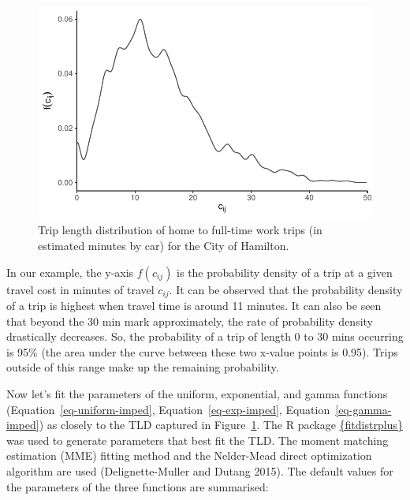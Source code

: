 \documentclass[12pt, oneside]{report}
\begin{document}
\begin{figure}

{\centering \includegraphics{tools-report_files/figure-pdf/fig-TLD-empirical-1.pdf}

}

\caption{\label{fig-TLD-empirical}Trip length distribution of home to
full-time work trips (in estimated minutes by car) for the City of
Hamilton.}

\end{figure}

In our example, the y-axis \(f(c_{ij})\) is the probability density of a
trip at a given travel cost in minutes of travel \(c_{ij}\). It can be
observed that the probability density of a trip is highest when travel
time is around 11 minutes. It can also be seen that beyond the 30 min
mark approximately, the rate of probability density drastically
decreases. So, the probability of a trip of length 0 to 30 mins
occurring is 95\% (the area under the curve between these two x-value
points is 0.95). Trips outside of this range make up the remaining
probability.

Now let's fit the parameters of the uniform, exponential, and gamma
functions (Equation~\ref{eq-uniform-imped}, Equation~\ref{eq-exp-imped},
Equation~\ref{eq-gamma-imped}) as closely to the TLD captured in
Figure~\ref{fig-TLD-empirical}. The R package
\href{https://cloud.r-project.org/web/packages/fitdistrplus/index.html}{\{fitdistrplus\}}
was used to generate parameters that best fit the TLD. The moment
matching estimation (MME) fitting method and the Nelder-Mead direct
optimization algorithm are used (Delignette-Muller and Dutang 2015). The
default values for the parameters of the three functions are summarised:
\end{document}
